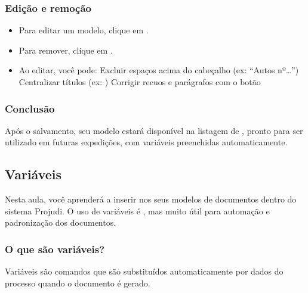 \documentclass[letterpaper,10pt,brazil]{sphinxmanual}
\begin{document}
\subsubsection{Edição e remoção}
\label{\detokenize{projud_48_criandomodelo:edicao-e-remocao}}\begin{itemize}
\item {} 
\sphinxAtStartPar
Para editar um modelo, clique em .

\item {} 
\sphinxAtStartPar
Para remover, clique em .

\item {} 
\sphinxAtStartPar
Ao editar, você pode:
\sphinxhyphen{} Excluir espaços acima do cabeçalho (ex: “Autos nº…”)
\sphinxhyphen{} Centralizar títulos (ex: )
\sphinxhyphen{} Corrigir recuos e parágrafos com o botão 

\end{itemize}


\subsubsection{Conclusão}
\label{\detokenize{projud_48_criandomodelo:conclusao}}
\sphinxAtStartPar
Após o salvamento, seu modelo estará disponível na listagem de , pronto para ser utilizado em futuras expedições, com variáveis preenchidas automaticamente.

\sphinxstepscope


\subsection{Variáveis}
\label{\detokenize{projud_49_variaveis:variaveis}}\label{\detokenize{projud_49_variaveis::doc}}
\sphinxAtStartPar
Nesta aula, você aprenderá a inserir  nos seus modelos de documentos dentro do sistema Projudi. O uso de variáveis é , mas muito útil para automação e padronização dos documentos.


\subsubsection{O que são variáveis?}
\label{\detokenize{projud_49_variaveis:o-que-sao-variaveis}}
\sphinxAtStartPar
Variáveis são comandos que são substituídos automaticamente por dados do processo quando o documento é gerado.
\end{document}
